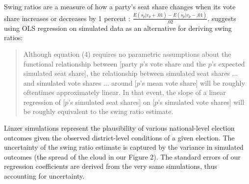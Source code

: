 \documentclass[letter,12pt]{article}
\begin{document}
Swing ratios are a measure of how a party's seat share changes when its vote share increases or decreases by 1 percent \citep{niemi.fett1986swing,tufte1973seatsVotes}: $\frac{E(s_p|v_p+.01) - E(s_p|v_p-.01)}{.02}$. \citet[][:408]{linzerSeatVoteElasticity2012} suggests using OLS regression on simulated data as an alternative for deriving swing ratios: 
\begin{quotation}
\singlespacing
\noindent Although equation (4) requires no parametric assumptions about the functional relationship between [party $p$'s vote share and the $p$'s expected simulated seat share], the relationship between simulated seat shares ... and simulated vote shares ... around [$p$'s mean vote share] will be roughly oftentimes approximately linear. In that event, the slope of a linear regression of [$p$'s simulated seat shares] on [$p$'s simulated vote shares] will be roughly equivalent to the swing ratio estimate. 
\end{quotation}
Linzer simulations represent the plausibility of various national-level election outcomes given the observed district-level conditions of a given election. The uncertainty of the swing ratio estimate is captured by the variance in simulated outcomes (the spread of the cloud in our Figure 2). The standard errors of our regression coefficients are derived from the very same simulations, thus accounting for uncertainty. 
\end{document}
